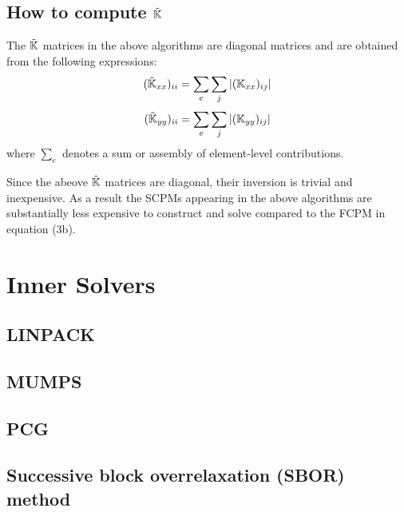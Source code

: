 \documentclass[a4paper,12pt]{article}
\begin{document}
\subsection{How to compute $\tilde{{\mathbb{K}}}$}

The $\tilde{{\mathbb{K}}}$ matrices in the above algorithms are diagonal 
matrices and are obtained from the
following expressions:
\[
(\tilde{{\mathbb{K}}}_{xx})_{ii} = \sum_e \sum_j | ({\mathbb{K}}_{xx})_{ij} |
\]
\[
(\tilde{{\mathbb{K}}}_{yy})_{ii} = \sum_e \sum_j | ({\mathbb{K}}_{yy})_{ij} |
\]
where $\sum_e$ denotes a sum or assembly of element-level contributions.

Since the abeove $\tilde{{\mathbb{K}}}$ matrices are diagonal, their inversion 
is trivial and inexpensive. As
a result the SCPMs appearing in the above algorithms are 
substantially less expensive to
construct and solve compared to the FCPM in equation (3b).



\newpage
\section{Inner Solvers}

\subsection{LINPACK}


\subsection{MUMPS}


\subsection{PCG}


\subsection{Successive block overrelaxation (SBOR) method}
\end{document}
